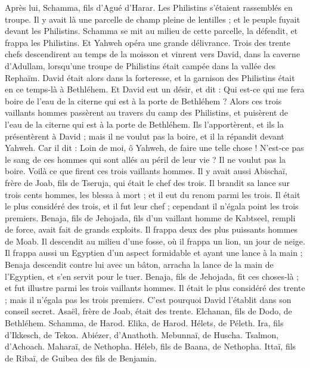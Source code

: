 \begin{multicols}{2}
Après lui, Schamma, fils d'Agué d'Harar. Les Philistins s'étaient rassemblés en troupe. Il y avait là une parcelle de champ pleine de lentilles ; et le peuple fuyait devant les Philistins.
Schamma se mit au milieu de cette parcelle, la défendit, et frappa les Philistins. Et Yahweh opéra une grande délivrance.
Trois des trente chefs descendirent au temps de la moisson et vinrent vers David, dans la caverne d'Adullam, lorsqu'une troupe de Philistins était campée dans la vallée des Rephaïm.
David était alors dans la forteresse, et la garnison des Philistins était en ce temps-là à Bethléhem.
Et David eut un désir, et dit : Qui est-ce qui me fera boire de l'eau de la citerne qui est à la porte de Bethléhem ?
Alors ces trois vaillants hommes passèrent au travers du camp des Philistins, et puisèrent de l'eau de la citerne qui est à la porte de Bethléhem. Ils l'apportèrent, et ils la présentèrent à David ; mais il ne voulut pas la boire, et il la répandit devant Yahweh.
Car il dit : Loin de moi, ô Yahweh, de faire une telle chose ! N'est-ce pas le sang de ces hommes qui sont allés au péril de leur vie ? Il ne voulut pas la boire. Voilà ce que firent ces trois vaillants hommes.
Il y avait aussi Abischaï, frère de Joab, fils de Tseruja, qui était le chef des trois. Il brandit sa lance sur trois cents hommes, les blessa à mort ; et il eut du renom parmi les trois.
Il était le plus considéré des trois, et il fut leur chef ; cependant il n'égala point les trois premiers.
Benaja, fils de Jehojada, fils d'un vaillant homme de Kabtseel, rempli de force, avait fait de grands exploits. Il frappa deux des plus puissants hommes de Moab. Il descendit au milieu d'une fosse, où il frappa un lion, un jour de neige.
Il frappa aussi un Egyptien d'un aspect formidable et ayant une lance à la main ; Benaja descendit contre lui avec un bâton, arracha la lance de la main de l'Egyptien, et s'en servit pour le tuer.
Benaja, fils de Jehojada, fit ces choses-là ; et fut illustre parmi les trois vaillants hommes.
Il était le plus considéré des trente ; mais il n'égala pas les trois premiers. C'est pourquoi David l'établit dans son conseil secret.
Asaël, frère de Joab, était des trente. Elchanan, fils de Dodo, de Bethléhem.
Schamma, de Harod. Elika, de Harod.
Hélets, de Péleth. Ira, fils d'Ikkesch, de Tekoa.
Abiézer, d'Anathoth. Mebunnaï, de Huscha.
Tsalmon, d'Achoach. Maharaï, de Nethopha.
Héleb, fils de Baana, de Nethopha. Ittaï, fils de Ribaï, de Guibea des fils de Benjamin.

\end{multicols}
